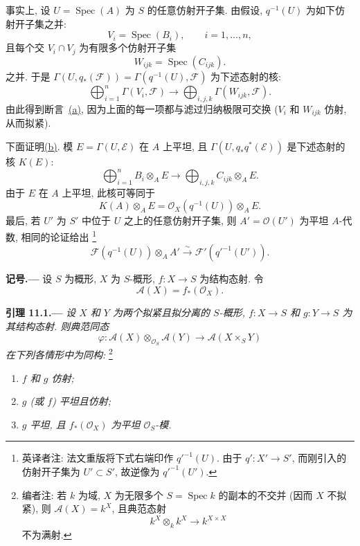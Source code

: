 事实上, 设 \(U=\operatorname{Spec}(A)\) 为 \(S\) 的任意仿射开子集.
由假设, \(q^{-1}(U)\) 为如下仿射开子集之并:
\[
  V_i=\operatorname{Spec}(B_i),\qquad i=1,\ldots,n,
\]
且每个交 \(V_i\cap V_j\) 为有限多个仿射开子集
\[
  W_{ijk}=\operatorname{Spec}(C_{ijk}).
\]
之并. 于是 \(\Gamma(U,q_*(\mathcal F))
  =\Gamma(q^{-1}(U),\mathcal F)\) 为下述态射的核:
\label{form:sga3-VIB-11.0-Cech-F}%
\[
  \bigoplus_{i=1}^{n}\Gamma(V_i,\mathcal F)
    \longrightarrow
  \bigoplus_{i,j,k}\Gamma(W_{ijk},\mathcal F).
\]
由此得到断言~\hyperref[concl:sga3-VIB-11.0-a]{\textup{(a)}},
因为上面的每一项都与滤过归纳极限可交换
\textup{(\(V_i\) 和 \(W_{ijk}\) 仿射, 从而拟紧)}.

下面证明\hyperref[concl:sga3-VIB-11.0-b]{\textup{(b)}}.
模 \(E=\Gamma(U,\mathcal E)\) 在 \(A\) 上平坦,
且 \(\Gamma(U,q_*q^*(\mathcal E))\) 是下述态射的核 \(K(E)\):
\label{form:sga3-VIB-11.0-Cech-E}%
\[
  \bigoplus_{i=1}^{n}B_i\otimes_AE
    \longrightarrow
  \bigoplus_{i,j,k}C_{ijk}\otimes_AE.
\]
由于 \(E\) 在 \(A\) 上平坦, 此核可等同于
\[
  K(A)\otimes_AE
    =\mathcal O_X(q^{-1}(U))\otimes_AE.
\]
最后, 若 \(U'\) 为 \(S'\) 中位于 \(U\) 之上的任意仿射开子集,
则 \(A'=\mathcal O(U')\) 为平坦 \(A\)-代数, 相同的论证给出%
\begingroup
\renewcommand{\thefootnote}{\fnsymbol{footnote}}%
\footnote[1]{\label{note:sga3-VIB-11.0-U-prime}
英译者注: 法文重版将下式右端印作 \(q'^{-1}(U)\).
由于 \(q':X'\to S'\), 而刚引入的仿射开子集为 \(U'\subset S'\),
故逆像为 \(q'^{-1}(U')\).}%
\endgroup
{}\label{form:sga3-VIB-11.0-local-base-change}%
\[
  \mathcal F(q^{-1}(U))\otimes_AA'
    \xrightarrow{\ \sim\ }
  \mathcal F'(q'^{-1}(U')).
\]

\medskip
{}\label{not:sga3-VIB-11-A}%
\noindent\textbf{记号.---}
设 \(S\) 为概形, \(X\) 为 \(S\)-概形,
\(f:X\to S\) 为结构态射. 令
\label{form:sga3-VIB-11-A-X}%
\[
  \mathcal A(X)=f_*(\mathcal O_X).
\]

\medskip
{}\label{lem:sga3-VIB-11.1}%
\noindent\textbf{引理 11.1.---}
\emph{设 \(X\) 和 \(Y\) 为两个拟紧且拟分离的 \(S\)-概形,
\(f:X\to S\) 和 \(g:Y\to S\) 为其结构态射. 则典范同态}
\label{form:sga3-VIB-11.1-phi}%
\[
  \varphi:
  \mathcal A(X)\otimes_{\mathcal O_S}\mathcal A(Y)
    \longrightarrow
  \mathcal A(X\times_SY)
\]
\emph{在下列各情形中为同构:}%
\footnote{\label{note:sga3-VIB-105}编者注: 若 \(k\) 为域, \(X\) 为无限多个
\(S=\operatorname{Spec}k\) 的副本的不交并
\textup{(因而 \(X\) 不拟紧)}, 则 \(\mathcal A(X)=k^X\), 且典范态射
\[
  k^X\otimes_k k^X\longrightarrow k^{X\times X}
\]
不为满射.}
\begin{enumerate}
\item[\textup{(a)}]\label{concl:sga3-VIB-11.1-a}
  \emph{\(f\) 和 \(g\) 仿射;}

\item[\textup{(b)}]\label{concl:sga3-VIB-11.1-b}
  \emph{\(g\) \textup{(或 \(f\))} 平坦且仿射;}

\item[\textup{(c)}]\label{concl:sga3-VIB-11.1-c}
  \emph{\(g\) 平坦, 且 \(f_*(\mathcal O_X)\) 为平坦 \(\mathcal O_S\)-模.}
\end{enumerate}

